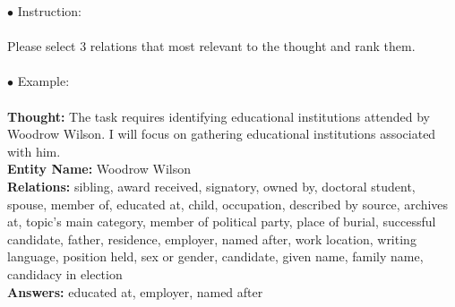 


\begin{tcolorbox}[prompt=
{\begin{prompt} \label{prompts for selecting relations}The Prompt for Relation Selection
\end{prompt}}]
$\bullet$ Instruction: \\ \\
Please select 3 relations that most relevant to the thought and rank them. \\ 
\\
$\bullet$ Example: \\ \\
\textbf{Thought: }The task requires identifying educational institutions attended by Woodrow Wilson.  I will focus on gathering educational institutions associated with him. \\
\textbf{Entity Name: }Woodrow Wilson \\
\textbf{Relations:} sibling, award received, signatory, owned by, doctoral student, spouse, member of, educated at, child, occupation, described by source, archives at, topic's main category, member of political party, place of burial, successful candidate, father, residence, employer, named after, work location, writing language, position held, sex or gender, candidate, given name, family name, candidacy in election\\
\textbf{Answers:} educated at, employer, named after
\end{tcolorbox}